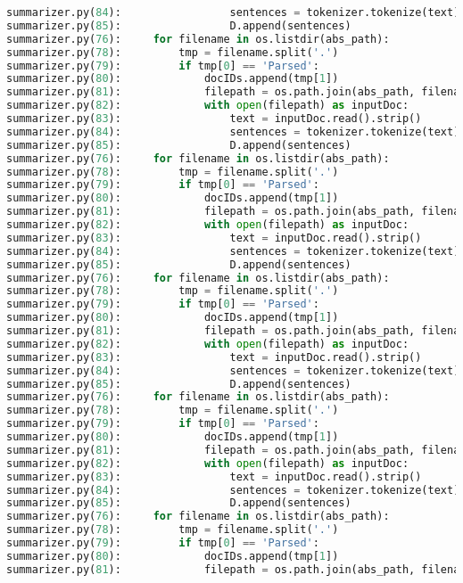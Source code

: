 \documentclass[11pt]{article}
\begin{document}
\begin{lstlisting}[language=Python]
summarizer.py(84):                 sentences = tokenizer.tokenize(text)
summarizer.py(85):                 D.append(sentences)
summarizer.py(76):     for filename in os.listdir(abs_path):
summarizer.py(78):         tmp = filename.split('.')
summarizer.py(79):         if tmp[0] == 'Parsed':
summarizer.py(80):             docIDs.append(tmp[1])
summarizer.py(81):             filepath = os.path.join(abs_path, filename)
summarizer.py(82):             with open(filepath) as inputDoc:
summarizer.py(83):                 text = inputDoc.read().strip()
summarizer.py(84):                 sentences = tokenizer.tokenize(text)
summarizer.py(85):                 D.append(sentences)
summarizer.py(76):     for filename in os.listdir(abs_path):
summarizer.py(78):         tmp = filename.split('.')
summarizer.py(79):         if tmp[0] == 'Parsed':
summarizer.py(80):             docIDs.append(tmp[1])
summarizer.py(81):             filepath = os.path.join(abs_path, filename)
summarizer.py(82):             with open(filepath) as inputDoc:
summarizer.py(83):                 text = inputDoc.read().strip()
summarizer.py(84):                 sentences = tokenizer.tokenize(text)
summarizer.py(85):                 D.append(sentences)
summarizer.py(76):     for filename in os.listdir(abs_path):
summarizer.py(78):         tmp = filename.split('.')
summarizer.py(79):         if tmp[0] == 'Parsed':
summarizer.py(80):             docIDs.append(tmp[1])
summarizer.py(81):             filepath = os.path.join(abs_path, filename)
summarizer.py(82):             with open(filepath) as inputDoc:
summarizer.py(83):                 text = inputDoc.read().strip()
summarizer.py(84):                 sentences = tokenizer.tokenize(text)
summarizer.py(85):                 D.append(sentences)
summarizer.py(76):     for filename in os.listdir(abs_path):
summarizer.py(78):         tmp = filename.split('.')
summarizer.py(79):         if tmp[0] == 'Parsed':
summarizer.py(80):             docIDs.append(tmp[1])
summarizer.py(81):             filepath = os.path.join(abs_path, filename)
summarizer.py(82):             with open(filepath) as inputDoc:
summarizer.py(83):                 text = inputDoc.read().strip()
summarizer.py(84):                 sentences = tokenizer.tokenize(text)
summarizer.py(85):                 D.append(sentences)
summarizer.py(76):     for filename in os.listdir(abs_path):
summarizer.py(78):         tmp = filename.split('.')
summarizer.py(79):         if tmp[0] == 'Parsed':
summarizer.py(80):             docIDs.append(tmp[1])
summarizer.py(81):             filepath = os.path.join(abs_path, filename)

\end{lstlisting}
\end{document}
